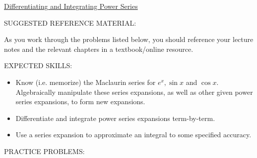\documentclass[12pt]{article}
\begin{document}
\begin{center}
\underline{\LARGE{Differentiating and Integrating Power Series}}
\end{center}

\noindent SUGGESTED REFERENCE MATERIAL:

\medskip

\noindent As you work through the problems listed below, you should reference your lecture notes and the relevant chapters in a textbook/online resource.

\medskip

\noindent EXPECTED SKILLS:

\medskip

\begin{itemize}[topsep=0pt]

\item Know (i.e. memorize) the Maclaurin series for $e^x, \sin{x}$ and $\cos{x}$.  Algebraically manipulate these series expansions, as well as other given power series expansions, to form new expansions.

\item Differentiate and integrate power series expansions term-by-term.

\item Use a series expansion to approximate an integral to some specified accuracy.   

\end{itemize}

\medskip

\noindent PRACTICE PROBLEMS:

\medskip
\end{document}
